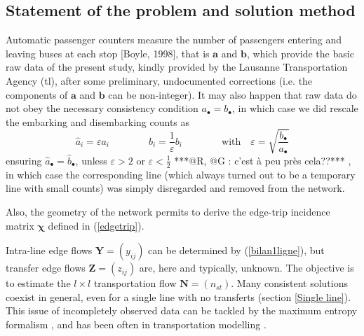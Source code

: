 \documentclass{bmcart}
\begin{document}
\subsection{Statement of the problem and solution method}
Automatic passenger counters measure the number of passengers entering and leaving buses at each stop [Boyle, 1998], that is $\mathbf{a}$ and $\mathbf{b}$, which provide the basic raw data of the present study, kindly provided by the Lausanne Transportation Agency (tl), after some preliminary, undocumented corrections (i.e. the components of $\mathbf{a}$ and $\mathbf{b}$ can be non-integer). It may also happen that raw data do not obey the necessary consistency condition  $a_\bullet=b_\bullet$, in which case we did rescale the embarking and disembarking counts as 
\begin{displaymath}
\hat{a}_i=\varepsilon a_i \qquad\qquad \hat{b}_i=\frac{1}{\varepsilon} b_i \qquad\qquad\mbox{with}\quad \varepsilon=\sqrt{\frac{b_\bullet}{a_\bullet}}
\end{displaymath}
ensuring $\hat{a}_\bullet=\hat{b}_\bullet$, unless $\varepsilon> 2$ or $\varepsilon<\frac{1}{2}$ ***@R, @G : c'est à peu près cela??*** , in which case the corresponding line (which always turned out to be a temporary line with small  counts) was simply disregarded and removed from the network. 


Also, the geometry of the network permits to derive the edge-trip incidence matrix $\bm{\chi}$ defined in (\ref{edgetrip}). 


Intra-line edge flows $\mathbf{Y}=(y_{ij})$ can be determined by (\ref{bilan1ligne}), but transfer edge flows $\mathbf{Z}=(z_{ij})$ are, here and typically, unknown. The objective is to estimate the $l\times l$ transportation flow $\mathbf{N}=(n_{st})$. Many consistent solutions coexist in general, even for a single line with no transferts (section \ref{Single line}). This issue of incompletely observed data can be tackled by the maximum entropy formalism \cite{jaynes1957information}, and has been often  in transportation modelling \cite{wilson1967statistical}  \cite{erlander1990gravity}. 
\end{document}
